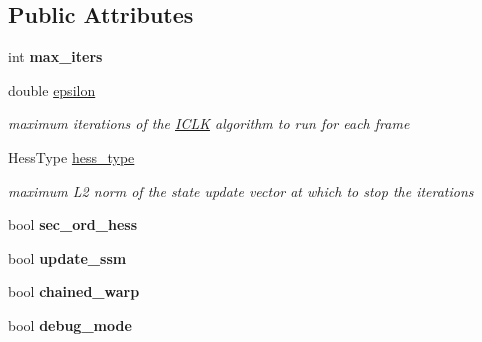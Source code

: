 \subsection*{Public Attributes}
\begin{DoxyCompactItemize}
\item 
\hypertarget{structICLKParams_a61c0bc94051ecefae6ffd263ec5bb6e0}{int {\bfseries max\-\_\-iters}}\label{structICLKParams_a61c0bc94051ecefae6ffd263ec5bb6e0}

\item 
\hypertarget{structICLKParams_a4390c0932e546ff1f947af5d0b24b162}{double \hyperlink{structICLKParams_a4390c0932e546ff1f947af5d0b24b162}{epsilon}}\label{structICLKParams_a4390c0932e546ff1f947af5d0b24b162}

\begin{DoxyCompactList}\small\item\em maximum iterations of the \hyperlink{classICLK}{I\-C\-L\-K} algorithm to run for each frame \end{DoxyCompactList}\item 
\hypertarget{structICLKParams_a07bb2297e80debb470a3696e1e1877c6}{Hess\-Type \hyperlink{structICLKParams_a07bb2297e80debb470a3696e1e1877c6}{hess\-\_\-type}}\label{structICLKParams_a07bb2297e80debb470a3696e1e1877c6}

\begin{DoxyCompactList}\small\item\em maximum L2 norm of the state update vector at which to stop the iterations \end{DoxyCompactList}\item 
\hypertarget{structICLKParams_aae7c66e6a6d77b2a3a95891064ec3cf2}{bool {\bfseries sec\-\_\-ord\-\_\-hess}}\label{structICLKParams_aae7c66e6a6d77b2a3a95891064ec3cf2}

\item 
\hypertarget{structICLKParams_a8e6e92fada7da215608de2913d77c1bf}{bool {\bfseries update\-\_\-ssm}}\label{structICLKParams_a8e6e92fada7da215608de2913d77c1bf}

\item 
\hypertarget{structICLKParams_a69537756ab955142e5f1a6302e6449a6}{bool {\bfseries chained\-\_\-warp}}\label{structICLKParams_a69537756ab955142e5f1a6302e6449a6}

\item 
\hypertarget{structICLKParams_a09054b8d4a1aac5060ddf2850ec989be}{bool {\bfseries debug\-\_\-mode}}\label{structICLKParams_a09054b8d4a1aac5060ddf2850ec989be}

\end{DoxyCompactItemize}


